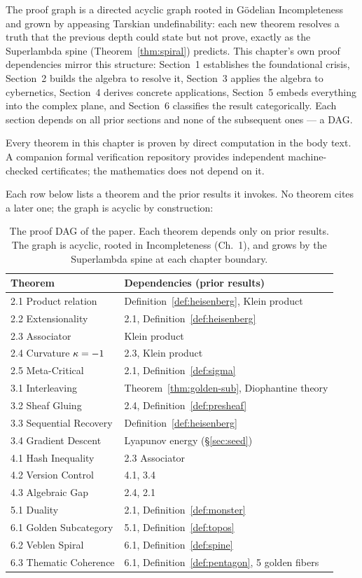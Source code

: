 The proof graph is a directed acyclic graph rooted in G\"odelian Incompleteness and grown by appeasing Tarskian undefinability: each new theorem resolves a truth that the previous depth could state but not prove, exactly as the Superlambda spine (Theorem~\ref{thm:spiral}) predicts. This chapter's own proof dependencies mirror this structure: Section~1 establishes the foundational crisis, Section~2 builds the algebra to resolve it, Section~3 applies the algebra to cybernetics, Section~4 derives concrete applications, Section~5 embeds everything into the complex plane, and Section~6 classifies the result categorically. Each section depends on all prior sections and none of the subsequent ones --- a DAG.

Every theorem in this chapter is proven by direct computation in the body text. A companion formal verification repository provides independent machine-checked certificates; the mathematics does not depend on it.

Each row below lists a theorem and the prior results it invokes. No theorem cites a later one; the graph is acyclic by construction:

\begin{table}[!ht]
\centering\small
\begin{tabular}{@{}lp{8cm}@{}}
\toprule
\textbf{Theorem} & \textbf{Dependencies (prior results)} \\
\midrule
2.1 Product relation & Definition~\ref{def:heisenberg}, Klein product \\
2.2 Extensionality & 2.1, Definition~\ref{def:heisenberg} \\
2.3 Associator & Klein product \\
2.4 Curvature $\kappa = -1$ & 2.3, Klein product \\
2.5 Meta-Critical & 2.1, Definition~\ref{def:sigma} \\
3.1 Interleaving & Theorem~\ref{thm:golden-sub}, Diophantine theory \\
3.2 Sheaf Gluing & 2.4, Definition~\ref{def:presheaf} \\
3.3 Sequential Recovery & Definition~\ref{def:heisenberg} \\
3.4 Gradient Descent & Lyapunov energy (\S\ref{sec:seed}) \\
4.1 Hash Inequality & 2.3 Associator \\
4.2 Version Control & 4.1, 3.4 \\
4.3 Algebraic Gap & 2.4, 2.1 \\
5.1 Duality & 2.1, Definition~\ref{def:monster} \\
6.1 Golden Subcategory & 5.1, Definition~\ref{def:topos} \\
6.2 Veblen Spiral & 6.1, Definition~\ref{def:spine} \\
6.3 Thematic Coherence & 6.1, Definition~\ref{def:pentagon}, 5 golden fibers \\
\bottomrule
\end{tabular}
\caption{The proof DAG of the paper. Each theorem depends only on prior results. The graph is acyclic, rooted in Incompleteness (Ch.~1), and grows by the Superlambda spine at each chapter boundary.}
\end{table}


